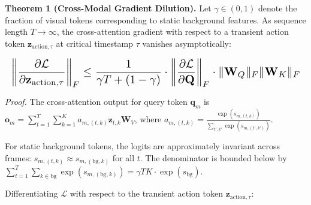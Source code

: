 \documentclass[11pt,a4paper]{article}
\begin{document}
\textbf{Theorem 1 (Cross-Modal Gradient Dilution).} Let $\gamma \in (0, 1)$ denote the fraction of visual tokens corresponding to static background features. As sequence length $T \to \infty$, the cross-attention gradient with respect to a transient action token $\mathbf{z}_{\text{action}, \tau}$ at critical timestamp $\tau$ vanishes asymptotically:













\begin{equation}
\resizebox{\columnwidth}{!}{$\displaystyle
\begin{aligned}
\left\| \frac{\partial \mathcal{L}}{\partial \mathbf{z}_{\text{action}, \tau}} \right\|_F \le \frac{1}{\gamma T + (1 - \gamma)} \cdot \left\| \frac{\partial \mathcal{L}}{\partial \mathbf{Q}} \right\|_F \cdot \|\mathbf{W}_Q\|_F \|\mathbf{W}_K\|_F
\end{aligned}
$}
\end{equation}













\textit{Proof.} The cross-attention output for query token $\mathbf{q}_m$ is $\mathbf{o}_m = \sum_{t=1}^T \sum_{k=1}^K a_{m, (t,k)} \mathbf{z}_{t, k} \mathbf{W}_V$, where $a_{m, (t,k)} = \frac{\exp(s_{m, (t,k)})}{\sum_{t', k'} \exp(s_{m, (t',k')})}$. 

For static background tokens, the logits are approximately invariant across frames: $s_{m, (t, k)} \approx s_{m, (\text{bg}, k)}$ for all $t$. The denominator is bounded below by $\sum_{t=1}^T \sum_{k \in \text{bg}} \exp(s_{m, (\text{bg}, k)}) = \gamma T K \cdot \exp(s_{\text{bg}})$. 

Differentiating $\mathcal{L}$ with respect to the transient action token $\mathbf{z}_{\text{action}, \tau}$:
\end{document}
